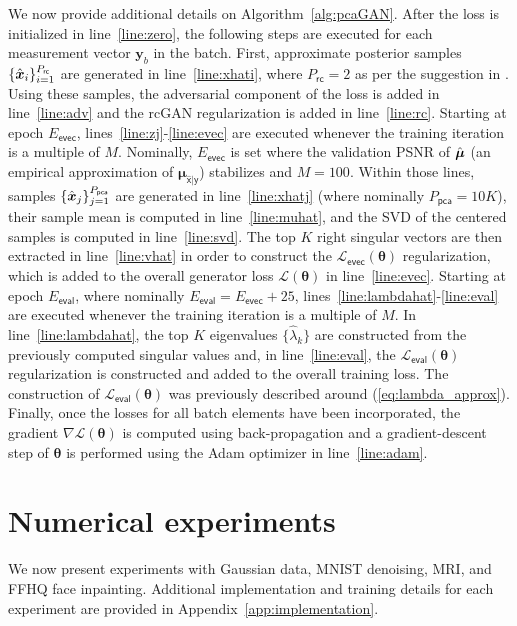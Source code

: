 \documentclass{article}
\theoremstyle{plain}
\theoremstyle{definition}
\theoremstyle{remark}
\renewcommand{\hat}{\widehat}
\newcommand{\hvec}[1]{\ensuremath{\Hat{\boldsymbol{#1}}}}
\renewcommand{\vec}[1]{\ensuremath{\boldsymbol{#1}}}
\newcommand{\mc}[1]{\ensuremath{\mathcal{#1}}}
\newcommand{\Algref}[1]{Algorithm~\ref{alg:#1}}
\newcommand{\lineref}[1]{line~\ref{line:#1}}
\renewcommand{\eqref}[1]{(\ref{eq:#1})}
\newcommand{\Appref}[1]{Appendix~\ref{app:#1}}
\newcommand{\train}{_{\mathsf{rc}}}
\newcommand{\eig}{_{\mathsf{pca}}}
\newcommand{\eval}{_{\mathsf{eval}}}
\newcommand{\evec}{_{\mathsf{evec}}}
\newcommand{\muxgyhat}{\vec{\mu}_{\hat{\mathsf{x}}|\mathsf{y}}}
\begin{document}
We now provide additional details on \Algref{pcaGAN}.
After the loss is initialized in \lineref{zero}, the following steps are executed for each measurement vector $\vec{y}_b$ in the batch.
First, approximate posterior samples $\{\hvec{x}_i\}_{i=1}^{P\train}$ are generated in \lineref{xhati}, where $P\train=2$ as per the suggestion in \cite{Bendel:NIPS:23}.
Using these samples, the adversarial component of the loss is added in \lineref{adv} and the rcGAN regularization is added in \lineref{rc}.
Starting at epoch $E\evec$, lines~\ref{line:zj}-\ref{line:evec} are executed whenever the training iteration is a multiple of $M$. 
Nominally, $E\evec$ is set where the validation PSNR of $\hvec{\mu}$ (an empirical approximation of $\muxgyhat$) stabilizes and $M=100$.
Within those lines, samples $\{\hvec{x}_j\}_{j=1}^{P\eig}$ are generated in \lineref{xhatj} (where nominally $P\eig=10K$), their sample mean is computed in \lineref{muhat}, and the SVD of the centered samples is computed in \lineref{svd}. 
The top $K$ right singular vectors are then extracted in \lineref{vhat} in order to construct the $\mc{L}\evec(\vec{\theta})$ regularization, which is added to the overall generator loss $\mc{L}(\vec{\theta})$ in \lineref{evec}.
Starting at epoch $E\eval$, where nominally $E\eval=E\evec+25$, lines~\ref{line:lambdahat}-\ref{line:eval} are executed whenever the training iteration is a multiple of $M$.
In \lineref{lambdahat}, the top $K$ eigenvalues $\{\hat{\lambda}_k\}$ are constructed from the previously computed singular values and, in \lineref{eval}, the $\mc{L}\eval(\vec{\theta})$ regularization is constructed and added to the overall training loss.
The construction of $\mc{L}\eval(\vec{\theta})$ was previously described around \eqref{lambda_approx}.
Finally, once the losses for all batch elements have been incorporated, the gradient $\nabla \mc{L}(\vec{\theta})$ is computed using back-propagation and a gradient-descent step of $\vec{\theta}$ is performed using the Adam optimizer \cite{Kingma:ICLR:15} in \lineref{adam}.

\section{Numerical experiments} \label{sec:experiments}
We now present experiments with Gaussian data, MNIST denoising, MRI, and FFHQ face inpainting.
Additional implementation and training details for each experiment are provided in \Appref{implementation}.
\end{document}
